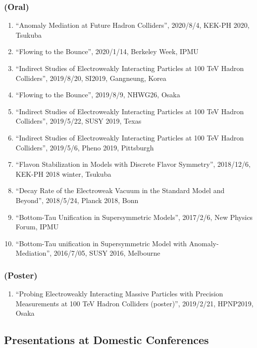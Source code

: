 \documentclass[12pt]{article}
\begin{document}
\subsubsection*{(Oral)}
\begin{enumerate}
 \item ``Anomaly Mediation at Future Hadron Colliders'', 2020/8/4, KEK-PH 2020, Tsukuba
 \item ``Flowing to the Bounce'', 2020/1/14, Berkeley Week, IPMU
 \item ``Indirect Studies of Electroweakly Interacting Particles at 100 TeV Hadron Colliders'', 2019/8/20, SI2019, Gangneung, Korea
 \item ``Flowing to the Bounce'', 2019/8/9, NHWG26, Osaka
 \item ``Indirect Studies of Electroweakly Interacting Particles at 100 TeV Hadron Colliders'', 2019/5/22, SUSY 2019, Texas
 \item ``Indirect Studies of Electroweakly Interacting Particles at 100 TeV Hadron Colliders'', 2019/5/6, Pheno 2019, Pittsburgh
 \item ``Flavon Stabilization in Models with Discrete Flavor Symmetry'', 2018/12/6, KEK-PH 2018 winter, Tsukuba
 \item ``Decay Rate of the Electroweak Vacuum in the Standard Model and Beyond'', 2018/5/24, Planck 2018, Bonn
 \item ``Bottom-Tau Unification in Supersymmetric Models'', 2017/2/6, New Physics Forum, IPMU
 \item ``Bottom-Tau unification in Supersymmetric Model with Anomaly-Mediation'', 2016/7/05, SUSY 2016, Melbourne
\end{enumerate}
\subsubsection*{(Poster)}
\begin{enumerate}
 \item ``Probing Electroweakly Interacting Massive Particles with Precision Measurements at 100 TeV Hadron Colliders (poster)'', 2019/2/21, HPNP2019, Osaka
\end{enumerate}

\subsection*{Presentations at Domestic Conferences}
\end{document}
